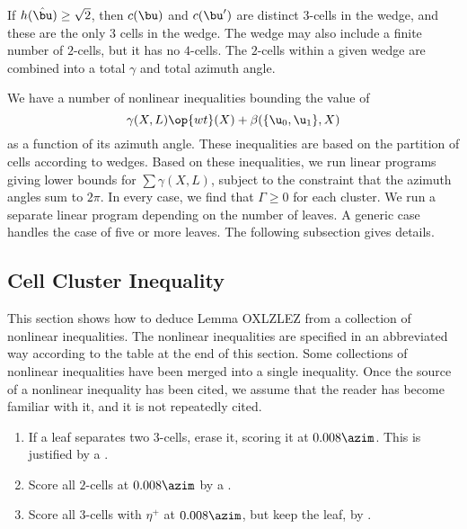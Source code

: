 If $h(\hat\bu)\ge\sqrt2$, then $c(\bu)$ and $c(\bu')$ are distinct $3$-cells in the wedge,
and these are the only $3$ cells in the wedge.  The wedge may also include a finite number of 
$2$-cells, but it has no $4$-cells.  The $2$-cells within a given wedge are combined into a 
total $\gamma$ and total azimuth angle.

We have a number of nonlinear inequalities bounding the value of 
\[
\gamma(X,L) \op{wt}(X) + \beta(\{\u_0,\u_1\},X)
\]
 as a function
of its azimuth angle.  These inequalities are based on the partition of cells according to wedges.
Based on these inequalities,
we run linear programs giving lower bounds for $\sum \gamma(X,L)$, subject to the constraint
that the azimuth angles sum to $2\pi$.  In every case, we find that $\Gamma\ge0$ for each cluster.
We run a separate linear program depending on the number of leaves.  A generic case handles
the case of five or more leaves.
The following subsection gives details.


\subsection{Cell Cluster Inequality}

This section shows how to deduce Lemma OXLZLEZ from a collection of nonlinear inequalities.
The nonlinear inequalities are specified in an abbreviated way according to the table at the end of this section.
Some collections of  nonlinear inequalities have been merged into a single inequality.
Once the source of a nonlinear inequality has been cited, we assume that the reader has become
familiar with it, and it is not repeatedly cited.

\begin{remark}[preparation]
\begin{enumerate}
\item If a leaf separates two $3$-cells, erase it, scoring it at $0.008\azim$.  This is justified by
a .
\item Score all $2$-cells at $0.008\azim$ by a .
\item Score all $3$-cells with $\eta ^+$ at $0.008\azim$, but keep the leaf, by .
\end{enumerate}
\end{remark}

